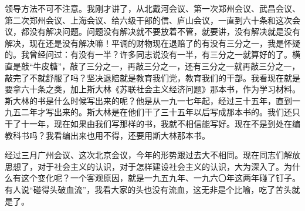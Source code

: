 领导方法不可不注意。我刚才讲了，从北戴河会议、第一次郑州会议、武昌会议、第二次郑州会议、上海会议、给六级干部的信、庐山会议，一直到六十条和这次会议，都没有解决问题。问题没有解决就不要放着不管，就要讲，没有解决就是没有解决，现在还是没有解决嘛！平调的财物现在退赔了的有没有三分之一，我是怀疑的。我曾经问过：有没有一半？许多同志说没有一半，有三分之一就算好的了。横直是敲“牛皮糖”，敲了三分之一，再敲三分之一，还有三分之一就再敲三分之一，敲完了不就舒服了吗？坚决退赔就是教育我们党，教育我们的干部。我看现在就是要拿六十条之类，加上斯大林《苏联社会主义经济问题》那本书，作为学习材料。斯大林的书是什么时候写出来的呢？他是从一九一七年起，经过三十五年，直到一九五二年才写出来的。斯大林是在他们干了三十五年以后写成那本书的。我们还只干了十一年，现在如果由我们写那样的书，我就不相信能写好。现在不是到处在编教科书吗？我看编出来也用不得，还要用斯大林那本书。

经过三月广州会议、这次北京会议，今年的形势跟过去大不相同。现在同志们解放思想了，对于社会主义的认识，对于怎样建设社会主义的认识，大为深入了。为什么有这个变化呢？一个客观原因，就是一九五九年、一九六〇年这两年碰了钉子。有人说“碰得头破血流”，我看大家的头也没有流血，这无非是个比喻，吃了苦头就是了。

